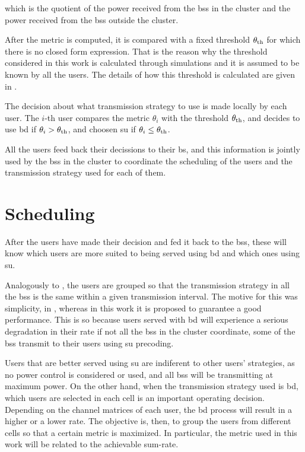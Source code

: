 \noindent
which is the quotient of the power received from the \glspl{bs} in the cluster
and the power received from the \glspl{bs} outside the cluster.

After the metric is computed, it is compared with a fixed threshold
$\theta_{\text{th}}$ for which there is no closed form expression. That is the
reason why the threshold considered in this work is calculated through
simulations and it is assumed to be known by all the users. The details of how
this threshold is calculated are given in .

The decision about what transmission strategy to use is made locally by each
user. The $i$-th user compares the metric $\theta_i$ with the threshold
$\theta_{\text{th}}$, and decides to use \gls{bd} if $\theta_i >
\theta_{\text{th}}$, and choosen \gls{su} if $\theta_i \leq \theta_{\text{th}}$.

All the users feed back their decissions to their \gls{bs}, and this information
is jointly used by the \glspl{bs} in the cluster to coordinate the scheduling of
the users and the transmission strategy used for each of them.

\section{Scheduling}\label{sec:sched_scheduling}

After the users have made their decision and fed it back to the \glspl{bs},
these will know which users are more suited to being served using \gls{bd} and
which ones using \gls{su}.

Analogously to \cite{moon13}, the users are grouped so that the transmission
strategy in all the \glspl{bs} is the same within a given transmission interval.
The motive for this was simplicity, in \cite{moon13}, whereas in this work it is
proposed to guarantee a good performance. This is so because users served with
\gls{bd} will experience a serious degradation in their rate if not all the
\glspl{bs} in the cluster coordinate, \ie some of the \glspl{bs} transmit to
their users using \gls{su} precoding.

Users that are better served using \gls{su} are indiferent to other users'
strategies, as no power control is considered or used, and all \glspl{bs} will
be transmitting at maximum power. On the other hand, when the transmission
strategy used is \gls{bd}, which users are selected in each cell is an important
operating decision. Depending on the channel matrices of each user, the \gls{bd}
process will result in a higher or a lower rate. The objective is, then, to
group the users from different cells so that a certain metric is maximized. In
particular, the metric used in this work will be related to the achievable
sum-rate.


